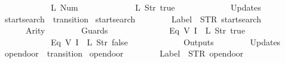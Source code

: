 \begin{isabellebody}
\ \ \ \ \ \ \ \ \ \ \ \ {\isacharparenleft}L\ {\isacharparenleft}Num\ {}{\isacharparenright}{\isacharparenright}{\isacharcomma}\isanewline
\ \ \ \ \ \ \ \ \ \ \ \ {\isacharparenleft}L\ {\isacharparenleft}Str\ {\isacharprime}{\isacharprime}true{\isacharprime}{\isacharprime}{\isacharparenright}{\isacharparenright}\isanewline
\ \ \ \ \ \ {\isacharbrackright}{\isacharcomma}\isanewline
\ \ \ \ \ \ Updates\ {\isacharequal}\ {\isacharbrackleft}{\isacharbrackright}\isanewline
{\isasymrparr}{\isachardoublequoteclose}\isanewline
\isanewline
{}\isamarkupfalse%
\ {\isachardoublequoteopen}startsearch{\isachardoublequoteclose}\ {\isacharcolon}{\isacharcolon}\ {\isachardoublequoteopen}transition{\isachardoublequoteclose}\ \isanewline
{\isachardoublequoteopen}startsearch\ {\isasymequiv}\ {\isasymlparr}\isanewline
\ \ \ \ \ \ Label\ {\isacharequal}\ STR\ {\isacharprime}{\isacharprime}startsearch{\isacharprime}{\isacharprime}{\isacharcomma}\isanewline
\ \ \ \ \ \ Arity\ {\isacharequal}\ {}{\isacharcomma}\isanewline
\ \ \ \ \ \ Guards\ {\isacharequal}\ {\isacharbrackleft}\isanewline
\ \ \ \ \ \ \ \ \ \ \ \ {\isacharparenleft}Eq\ {\isacharparenleft}V\ {\isacharparenleft}I\ {}{\isacharparenright}{\isacharparenright}\ {\isacharparenleft}L\ {\isacharparenleft}Str\ {\isacharprime}{\isacharprime}true{\isacharprime}{\isacharprime}{\isacharparenright}{\isacharparenright}{\isacharparenright}{\isacharcomma}\isanewline
\ \ \ \ \ \ \ \ \ \ \ \ {\isacharparenleft}Eq\ {\isacharparenleft}V\ {\isacharparenleft}I\ {}{\isacharparenright}{\isacharparenright}\ {\isacharparenleft}L\ {\isacharparenleft}Str\ {\isacharprime}{\isacharprime}false{\isacharprime}{\isacharprime}{\isacharparenright}{\isacharparenright}{\isacharparenright}\isanewline
\ \ \ \ \ \ {\isacharbrackright}{\isacharcomma}\isanewline
\ \ \ \ \ \ Outputs\ {\isacharequal}\ {\isacharbrackleft}{\isacharbrackright}{\isacharcomma}\isanewline
\ \ \ \ \ \ Updates\ {\isacharequal}\ {\isacharbrackleft}{\isacharbrackright}\isanewline
{\isasymrparr}{\isachardoublequoteclose}\isanewline
\isanewline
{}\isamarkupfalse%
\ {\isachardoublequoteopen}opendoor{}{\isachardoublequoteclose}\ {\isacharcolon}{\isacharcolon}\ {\isachardoublequoteopen}transition{\isachardoublequoteclose}\ \isanewline
{\isachardoublequoteopen}opendoor{}\ {\isasymequiv}\ {\isasymlparr}\isanewline
\ \ \ \ \ \ Label\ {\isacharequal}\ STR\ {\isacharprime}{\isacharprime}opendoor{\isacharprime}{\isacharprime}{\isacharcomma}\isanewline

\end{isabellebody}
